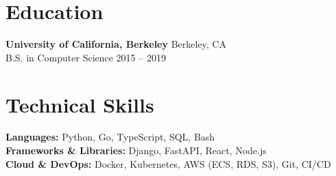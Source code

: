 \documentclass[10pt,a4paper]{article}
\begin{document}
\section{Education}
\textbf{University of California, Berkeley} \hfill Berkeley, CA\\
B.S. in Computer Science \hfill 2015 -- 2019

\section{Technical Skills}
\textbf{Languages:} Python, Go, TypeScript, SQL, Bash\\
\textbf{Frameworks \& Libraries:} Django, FastAPI, React, Node.js\\
\textbf{Cloud \& DevOps:} Docker, Kubernetes, AWS (ECS, RDS, S3), Git, CI/CD
\end{document}
